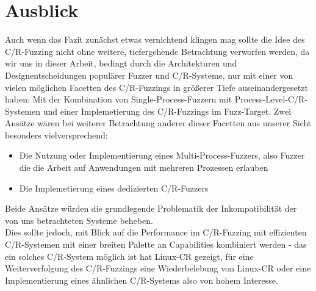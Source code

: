 \documentclass[a4paper]{article}
\begin{document}
\section{Ausblick}
Auch wenn das Fazit zunächst etwas vernichtend klingen mag sollte die Idee des C/R-Fuzzing nicht ohne weitere, tiefergehende Betrachtung verworfen werden, da wir uns in dieser Arbeit, bedingt durch die Architekturen und Designentscheidungen populärer Fuzzer und C/R-Systeme, nur mit einer von vielen möglichen Facetten des C/R-Fuzzings in größerer Tiefe auseinandergesetzt haben: Mit der Kombination von Single-Process-Fuzzern mit Process-Level-C/R-Systemen und einer Implemetierung des C/R-Fuzzings im Fuzz-Target. Zwei Ansätze wären bei weiterer Betrachtung anderer dieser Facetten aus unserer Sicht besonders vielversprechend:
\begin{itemize}
    \item Die Nutzung oder Implementierung eines Multi-Process-Fuzzers, also Fuzzer die die Arbeit auf Anwendungen mit mehreren Prozessen erlauben%
    \item Die Implemetierung eines dedizierten C/R-Fuzzers
\end{itemize}
Beide Ansätze würden die grundlegende Problematik der Inkompatibilität der von uns betrachteten Systeme beheben.\\
Dies sollte jedoch, mit Blick auf die Performance im C/R-Fuzzing mit effizienten C/R-Systemen mit einer breiten Palette an Capabilities kombiniert werden - das ein solches C/R-System möglich ist hat Linux-CR gezeigt, für eine Weiterverfolgung des C/R-Fuzzings eine Wiederbelebung von Linux-CR oder eine Implementierung eines ähnlichen C/R-Systems also von hohem Interesse.
\end{document}
